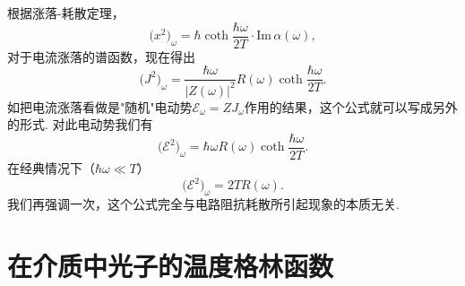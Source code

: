 根据涨落-耗散定理，
\begin{equation*}
\bigl(x^{2}\bigr)_{\omega}=\hbar\coth\frac{\hbar\omega}{2T}\cdot\mathrm{Im}\,\alpha(\omega),
\end{equation*}
对于电流涨落的谱函数，现在得出
\begin{equation}
\bigl(J^{2}\bigr)_{\omega}=\frac{\hbar\omega}{|Z(\omega)|^{2}}R(\omega)\coth\frac{\hbar\omega}{2T}.
\end{equation}
如把电流涨落看做是"随机"电动势$\mathcal{E}_{\omega}=ZJ_{\omega}$作用的结果，这个公式就可以写成另外的形式. 对此电动势我们有
\begin{equation}
\bigl(\mathcal{E}^{2}\bigr)_{\omega}=\hbar\omega R(\omega)\coth\frac{\hbar\omega}{2T}.
\end{equation}
在经典情况下（$\hbar\omega\ll T$）
\begin{equation}
\bigl(\mathcal{E}^{2}\bigr)_{\omega}=2TR(\omega).
\end{equation}
我们再强调一次，这个公式完全与电路阻抗耗散所引起现象的本质无关.

\section{在介质中光子的温度格林函数}

